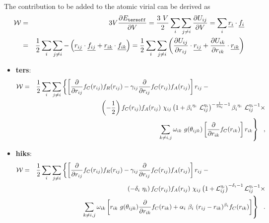 The contribution to be added to the atomic virial can be derived
as
\begin{eqnarray}
{\cal W} & = & 3V \frac{\partial E_{\tt tersoff}}{\partial V} =
\frac{3~V}{2} \sum_{i} \sum_{j \neq i} \frac{\partial U_{ij}}{\partial V} = \sum_{i} \mbox{$\underline{r_{i}}$} \cdot \mbox{$\underline{f_{i}}$} \\
&=& \frac{1}{2}\sum_{i} \sum_{j \neq i} -\left( \mbox{$\underline{r_{ij}}$} \cdot \mbox{$\underline{f_{ij}}$} + \mbox{$\underline{r_{ik}}$} \cdot \mbox{$\underline{f_{ik}}$} \right) = \frac{1}{2}\sum_{i} \sum_{j \neq i} \left(\frac{\partial U_{ij}}{\partial r_{ij}} \cdot \mbox{$\underline{r_{ij}}$} + \frac{\partial U_{ik}}{\partial r_{ik}} \cdot \mbox{$\underline{r_{ik}}$}\right) \nonumber
\end{eqnarray}
\begin{itemize}
\item {\bf ters}:
\begin{eqnarray}
{\cal W} &=& \frac{1}{2} \sum_{i} \sum_{j \neq i} \left\{ \left[
\frac{\partial}{\partial r_{ij}} f_{C}(r_{ij}) f_{R}(r_{ij}) -
\gamma_{ij} \frac{\partial}{\partial r_{ij}} f_{C}(r_{ij}) f_{A}(r_{ij}) \right] r_{ij} - \phantom{xxxxxxxxxxxxxxx} \right. \nonumber \\
& & \phantom{xxxxxxxx} \left( -\frac{1}{2} \right) f_{C}(r_{ij}) f_{A}(r_{ij})~\chi_{ij}
\left( 1 + {\beta_{i}}^{\eta_{i}}~{\cal{L}}_{ij}^{\eta_{i}} \right)^{-\frac{1}{2 \eta_{i}} - 1}
{\beta_{i}}^{\eta_{i}}~{\cal{L}}_{ij}^{\eta_{i}-1} \times \\
& & \phantom{xxxxxxxx} \left. \sum_{k \neq i,j} \omega_{ik}~g(\theta_{ijk}) \left[
\frac{\partial}{\partial r_{ik}} f_{C}(r_{ik}) \right] r_{ik} \right\}~~,
\nonumber
\end{eqnarray}
\item {\bf hiks}:
\begin{eqnarray}
{\cal W} &=& \frac{1}{2} \sum_{i} \sum_{j \neq i} \left\{ \left[
\frac{\partial}{\partial r_{ij}} f_{C}(r_{ij}) f_{R}(r_{ij}) -
\gamma_{ij} \frac{\partial}{\partial r_{ij}} f_{C}(r_{ij}) f_{A}(r_{ij}) \right] r_{ij} - \phantom{xxxxxxxxxxxxxxx} \right. \nonumber \\
& & \phantom{xxxxxxxx} \left(-\delta_{i}~\eta_{i}\right) f_{C}(r_{ij}) f_{A}(r_{ij})~\chi_{ij}
\left( 1 + {\cal{L}}_{ij}^{\eta_{i}} \right)^{-\delta_{i} - 1} {\cal{L}}_{ij}^{\eta_{i}-1} \times \\
& & \phantom{xxxxxxxx} \left. \sum_{k \neq i,j} \omega_{ik} \left[r_{ik}~g(\theta_{ijk})\frac{\partial}{\partial r_{ik}} f_{C}(r_{ik}) +
\alpha_{i}~\beta_{i}~(r_{ij}-r_{ik})^{\beta_{i}}f_{C}(r_{ik}) \right] \right\}~~.
\nonumber
\end{eqnarray}
\end{itemize}

